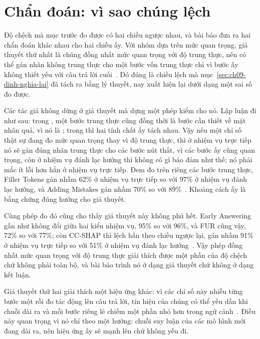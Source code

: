 \section{Chẩn đoán: vì sao chúng lệch}
\label{sec:ch09-chan-doan}

%
%
Độ chệch mà mục trước đo được có hai chiều ngược nhau, và bài báo đưa ra hai
chẩn đoán khác nhau cho hai chiều ấy. Với nhóm dựa trên mức quan trọng, giả
thuyết thứ nhất là chúng đồng nhất mức quan trọng với độ trung thực, nên có
thể gán nhãn không trung thực cho một bước vốn trung thực chỉ vì bước ấy không
thiết yếu với câu trả lời cuối~\autocite{p21metrics}. Đó đúng là chiều lệch mà
mục~\ref{sec:ch09-dinh-nghia-lai} đã tách ra bằng lý thuyết, nay xuất hiện lại
dưới dạng một sai số đo được.

Các tác giả không dừng ở giả thuyết mà dựng một phép kiểm cho nó. Lập luận đi như sau: trong
, một bước
trung thực cũng đồng thời là bước cần thiết về mặt nhân quả, vì nó là
; trong
 thì hai tính chất ấy tách nhau.
Vậy nếu
một chỉ số thật sự đang đo mức quan trọng thay vì độ trung thực, thì ở nhiệm
vụ trực tiếp nó sẽ gán đúng nhãn trung thực cho các bước nút thắt, vì các bước
ấy cũng quan trọng, còn ở nhiệm vụ đánh lạc hướng thì không có gì bảo đảm như
thế; nó phải mắc ít lỗi hơn hẳn ở nhiệm vụ trực tiếp. Đem đo trên riêng các
bước trung thực,
Filler Tokens gán nhầm 62\% ở nhiệm vụ trực tiếp so với 97\% ở nhiệm vụ đánh
lạc hướng, và Adding Mistakes gán nhầm 70\% so với 89\%~\autocite{p21metrics}.
Khoảng cách ấy là bằng chứng đúng hướng cho giả thuyết.

Cùng phép đo đó cũng cho thấy giả thuyết này không phủ hết. Early Answering gần
như không đổi giữa hai kiểu nhiệm vụ, 95\% so với 96\%, và FUR cũng vậy, 72\%
so với 77\%; còn CC-SHAP thì lệch hẳn theo chiều ngược lại,
gán nhầm 91\% ở nhiệm vụ trực tiếp so với 51\% ở nhiệm vụ đánh lạc
hướng~\autocite{p21metrics}. Vậy phép đồng nhất mức quan trọng với
độ trung thực giải thích được một phần của độ chệch chứ không phải toàn bộ, và
bài báo trình nó ở dạng giả thuyết chứ không ở dạng kết luận.

Giả thuyết thứ hai giải thích một hiệu ứng khác: vì các chỉ số này nhiễu từng
bước một rồi đo tác động lên câu trả lời, tín hiệu của chúng có thể yếu dần khi
chuỗi dài ra và mỗi bước riêng lẻ chiếm một phần nhỏ hơn trong ngữ
cảnh~\autocite{p21metrics}. Điều này quan trọng vì nó chỉ theo một hướng: chuỗi
suy luận của các mô hình mới đang dài ra, nên hiệu ứng ấy sẽ mạnh lên chứ không
yếu đi.


